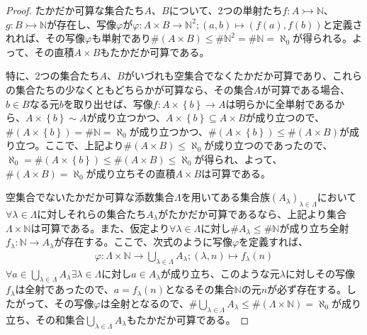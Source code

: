 \documentclass[dvipdfmx]{jsarticle}
\begin{document}
\begin{proof}
たかだか可算な集合たち$A$、$B$について、2つの単射たち$f:A \rightarrowtail \mathbb{N}$、$g:B \rightarrowtail \mathbb{N}$が存在し、写像$\varphi$が$\varphi:A \times B \rightarrow \mathbb{N}^{2};(a,b) \mapsto \left( f(a),f(b) \right)$と定義されれば、その写像$\varphi$も単射であり$\# (A \times B) \leq \# \mathbb{N}^{2} = \# \mathbb{N} = \aleph_{0}$が得られる。よって、その直積$A \times B$もたかだか可算である。\par
特に、2つの集合たち$A$、$B$がいづれも空集合でなくたかだか可算であり、これらの集合たちの少なくともどちらかが可算なら、その集合$A$が可算である場合、$b \in B$なる元$b$を取り出せば、写像$f:A \times \left\{ b \right\} \rightarrow A$は明らかに全単射であるから、$A \times \left\{ b \right\} \sim A$が成り立つかつ、$A \times \left\{ b \right\} \subseteq A \times B$が成り立つので、$\# \left( A \times \left\{ b \right\} \right) = \# \mathbb{N} = \aleph_{0}$が成り立つかつ、$\# \left( A \times \left\{ b \right\} \right) \leq \# (A \times B)$が成り立つ。ここで、上記より$\# (A \times B) \leq \aleph_{0}$が成り立つのであったので、$\aleph_{0} = \# \left( A \times \left\{ b \right\} \right) \leq \# (A \times B) \leq \aleph_{0}$が得られ、よって、$\# (A \times B) = \aleph_{0}$が成り立ちその直積$A \times B$は可算である。\par
空集合でないたかだか可算な添数集合$\varLambda$を用いてある集合族$\left( A_{\lambda} \right)_{\lambda \in \varLambda}$において$\forall\lambda \in \varLambda$に対しそれらの集合たち$A_{\lambda}$がたかだか可算であるなら、上記より集合$\varLambda \times \mathbb{N}$は可算である。また、仮定より$\forall\lambda \in \varLambda$に対し$\# A_{\lambda} \leq \# \mathbb{N}$が成り立ち全射$f_{\lambda}:\mathbb{N} \rightarrow A_{\lambda}$が存在する。ここで、次式のように写像$\varphi$を定義すれば、
\begin{align*}
\varphi:\varLambda \times \mathbb{N} \rightarrow \bigcup_{\lambda \in \varLambda} A_{\lambda};(\lambda,n) \mapsto f_{\lambda}(n)
\end{align*}
$\forall a \in \bigcup_{\lambda \in \varLambda} A_{\lambda}\exists\lambda \in \varLambda$に対し$a \in A_{\lambda}$が成り立ち、このような元$\lambda$に対しその写像$f_{\lambda}$は全射であったので、$a = f_{\lambda}(n)$となるその集合$\mathbb{N}$の元$n$が必ず存在する。したがって、その写像$\varphi$は全射となるので、$\# {\bigcup_{\lambda \in \varLambda} A_{\lambda}} \leq \# \left( \varLambda \times \mathbb{N} \right) = \aleph_{0}$が成り立ち、その和集合$\bigcup_{\lambda \in \varLambda} A_{\lambda}$もたかだか可算である。\par

\end{proof}
\end{document}

